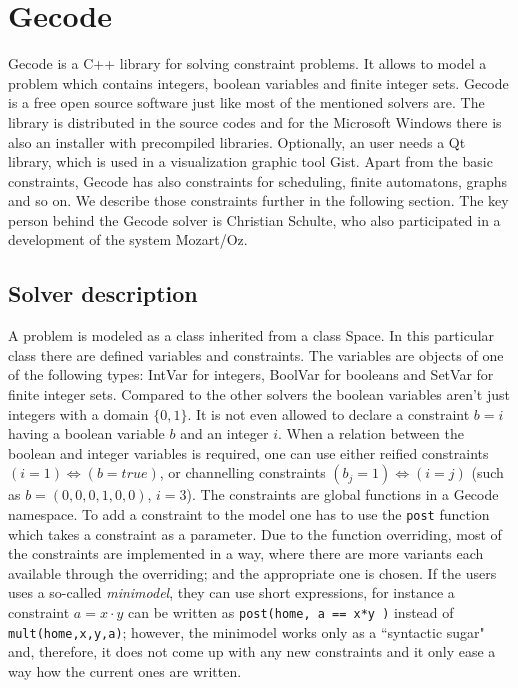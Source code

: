 \section{Gecode}

Gecode is a C++ library for solving constraint problems. It allows to
model a problem which contains integers, boolean variables and finite integer sets. Gecode
is a free open source software just like most of the mentioned solvers are. The library is
distributed in the source codes and for the Microsoft Windows there is also an installer with
precompiled libraries. Optionally, an user needs a Qt library, which is used in 
a visualization graphic tool Gist. Apart from the basic constraints, Gecode has also 
constraints for scheduling, finite automatons, graphs and so on. We describe those
constraints further in the following section. The key person behind the Gecode 
solver is Christian Schulte, who also participated in a development of the system Mozart/Oz. 

\subsection{Solver description}
A problem is modeled as a class inherited from a class Space. In this particular class
there are defined variables and constraints. The variables are objects of one of the following types:
IntVar for integers, BoolVar for booleans and SetVar for finite integer sets. 
Compared to the other solvers the boolean variables aren't just integers with a domain $\{0,1\}$.
It is not even allowed to declare a constraint $b=i$ having a boolean variable $b$ and an integer $i$.
When a relation between the boolean and integer variables is required, one can use either reified constraints
 $(i = 1) \Leftrightarrow (b = true)$, or channelling constraints $(b_j = 1) \Leftrightarrow (i = j)$ (such as $b = (0,0,0,1,0,0)$, $i = 3$).
The constraints are global functions in a Gecode namespace. To add a constraint to the model
one has to use the \texttt{post} function which takes a constraint as a parameter.
Due to the function overriding, most of the constraints are implemented in a way, 
where there are more variants each available through the overriding; and the appropriate one is chosen.
If the users uses a so-called {\em minimodel}, they can use short expressions,
for instance a constraint $a = x \cdot y$ can be written as \texttt{post(home, a == x*y )} instead of \texttt{mult(home,x,y,a)}; 
however, the minimodel works only as a ``syntactic sugar" and, therefore, it does not come up 
with any new constraints and it only ease a way how the current ones are written. 

